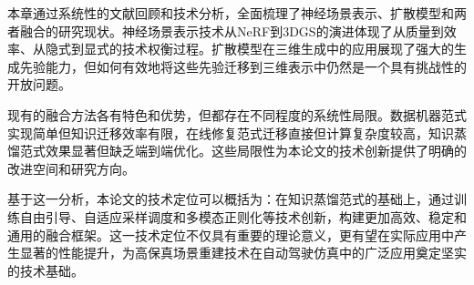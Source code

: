 本章通过系统性的文献回顾和技术分析，全面梳理了神经场景表示、扩散模型和两者融合的研究现状。神经场景表示技术从NeRF到3DGS的演进体现了从质量到效率、从隐式到显式的技术权衡过程。扩散模型在三维生成中的应用展现了强大的生成先验能力，但如何有效地将这些先验迁移到三维表示中仍然是一个具有挑战性的开放问题。

现有的融合方法各有特色和优势，但都存在不同程度的系统性局限。数据机器范式实现简单但知识迁移效率有限，在线修复范式迁移直接但计算复杂度较高，知识蒸馏范式效果显著但缺乏端到端优化。这些局限性为本论文的技术创新提供了明确的改进空间和研究方向。

基于这一分析，本论文的技术定位可以概括为：在知识蒸馏范式的基础上，通过训练自由引导、自适应采样调度和多模态正则化等技术创新，构建更加高效、稳定和通用的融合框架。这一技术定位不仅具有重要的理论意义，更有望在实际应用中产生显著的性能提升，为高保真场景重建技术在自动驾驶仿真中的广泛应用奠定坚实的技术基础。
